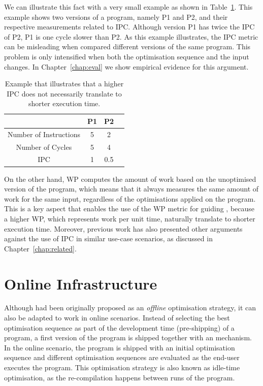 We can illustrate this fact with a very small example as shown in Table~\ref{tab:ipc-example}.
This example shows two versions of a program, namely P1 and P2, and their respective measurements related to IPC.
Although version P1 has twice the IPC of P2, P1 is one cycle slower than P2.
As this example illustrates, the IPC metric can be misleading when compared different versions of the same program.
This problem is only intensified when both the optimisation sequence and the input changes.
In Chapter~\ref{chap:eval} we show empirical evidence for this argument.

\begin{table}[h]
\centering
\begin{tabular}{|c|c|c|c|}
\hline
                       & P1 & P2  \\
\hline
Number of Instructions & 5  & 2   \\
Number of Cycles       & 5  & 4   \\
IPC                    & 1  & 0.5 \\
\hline
\end{tabular}
\caption{Example that illustrates that a higher IPC does not necessarily translate to shorter execution time.}
\label{tab:ipc-example}
\end{table}

On the other hand, WP computes the amount of work based on the unoptimised version of the program, which means that it always measures the same amount of work for the same input, regardless of the optimisations applied on the program.
This is a key aspect that enables the use of the WP metric for guiding {\itercomp}, because a higher WP, which represents work per unit time, naturally translate to shorter execution time.
Moreover, previous work has also presented other arguments against the use of IPC in similar use-case scenarios, as discussed in Chapter~\ref{chap:related}.
  
\section{Online {\IterComp} Infrastructure} \label{sec:oic-infra}

Although {\itercomp} had been originally proposed as an \textit{offline} optimisation strategy, it can also be adapted to work in online scenarios.
Instead of selecting the best optimisation sequence as part of the development time (pre-shipping) of a program, a first version of the program is shipped together with an {\itercomp} mechanism.
In the online scenario, the program is shipped with an initial optimisation sequence and different optimisation sequences are evaluated as the end-user executes the program.
This optimisation strategy is also known as idle-time optimisation, as the re-compilation happens between runs of the program.

